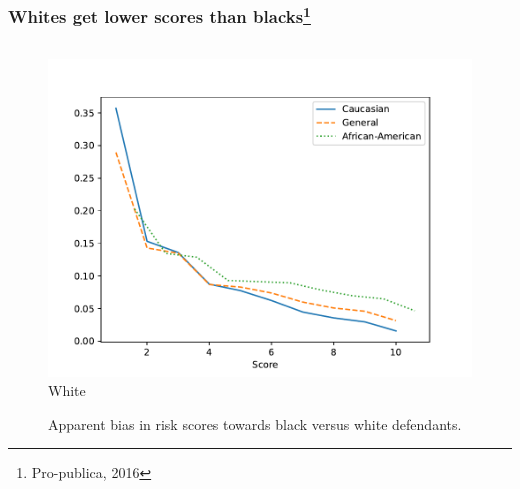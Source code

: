 \begin{frame}
  \frametitle{Whites get lower scores than blacks\footnote{Pro-publica, 2016}}
  \begin{figure}[H]
    \begin{columns}
      \begin{column}{0.5\textwidth}
        \centering
        \includegraphics[width=\columnwidth]{../figures/Scores-by-race}      
        White
      \end{column}
    \end{columns}
    \label{fig:risk-bias}
    \caption{Apparent bias in risk scores towards black versus white defendants.}
  \end{figure}
\end{frame}

